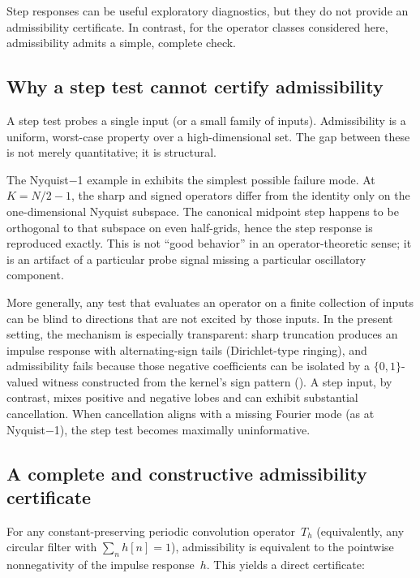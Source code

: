 \documentclass[11pt,a4paper]{article}
\theoremstyle{plain}
\theoremstyle{definition}
\theoremstyle{plain}
\begin{document}
Step responses can be useful exploratory diagnostics, but they do not provide an
admissibility certificate.  In contrast, for the operator classes considered
here, admissibility admits a simple, complete check.


\subsection{Why a step test cannot certify admissibility}
\label{sec:why-not}

A step test probes a single input (or a small family of inputs).  Admissibility
is a uniform, worst-case property over a high-dimensional set.  The gap between
these is not merely quantitative; it is structural.

The Nyquist$-$1 example in  exhibits the simplest
possible failure mode.  At $K = N/2-1$, the sharp and signed operators differ
from the identity only on the one-dimensional Nyquist subspace.  The canonical
midpoint step happens to be orthogonal to that subspace on even half-grids, hence
the step response is reproduced exactly.  This is not ``good behavior'' in an
operator-theoretic sense; it is an artifact of a particular probe signal missing
a particular oscillatory component.

More generally, any test that evaluates an operator on a finite collection of
inputs can be blind to directions that are not excited by those inputs.  In the
present setting, the mechanism is especially transparent: sharp truncation
produces an impulse response with alternating-sign tails (Dirichlet-type
ringing), and admissibility fails because those negative coefficients can be
isolated by a $\{0,1\}$-valued witness constructed from the kernel's sign pattern
().  A step input, by contrast, mixes positive and negative lobes
and can exhibit substantial cancellation.  When cancellation aligns with a
missing Fourier mode (as at Nyquist$-$1), the step test becomes maximally
uninformative.


\subsection{A complete and constructive admissibility certificate}
\label{sec:complete-cert}

For any constant-preserving periodic convolution operator~$T_h$ (equivalently,
any circular filter with $\sum_n h[n] = 1$), admissibility is equivalent to the
pointwise nonnegativity of the impulse response~$h$.  This yields a direct
certificate:
\end{document}
